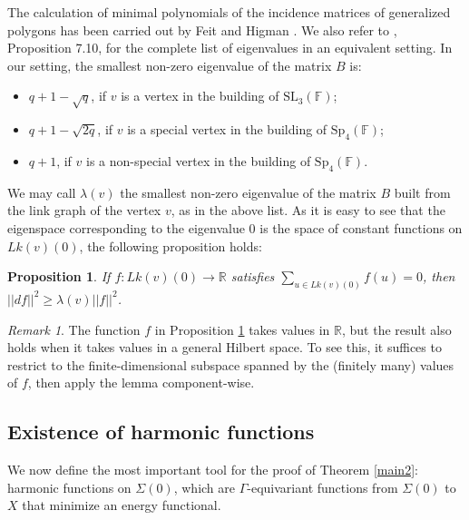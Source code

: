 \documentclass{article}
\theoremstyle{definition}
\theoremstyle{remark}
\newtheorem{rmk}[dfn]{Remark}
\theoremstyle{plain}
\newtheorem{prp}[dfn]{Proposition}
\begin{document}
The calculation of minimal polynomials of the incidence matrices of generalized polygons has been carried out by Feit and Higman \cite{feithigman}. We also refer to \cite{garland}, Proposition 7.10, for the complete list of eigenvalues in an equivalent setting. In our setting, the smallest non-zero eigenvalue of the matrix $B$ is:

\begin{itemize}
    \item $q+1-\sqrt{q}$, if $v$ is a vertex in the building of $\mathrm{SL}_3(\mathbb{F})$;
    \item $q+1-\sqrt{2q}$, if $v$ is a special vertex in the building of $\mathrm{Sp}_4(\mathbb{F})$;
    \item $q+1$, if $v$ is a non-special vertex in the building of $\mathrm{Sp}_4(\mathbb{F})$.
\end{itemize}

We may call $\lambda(v)$ the smallest non-zero eigenvalue of the matrix $B$ built from the link graph of the vertex $v$, as in the above list. As it is easy to see that the eigenspace corresponding to the eigenvalue $0$ is the space of constant functions on $Lk(v)(0)$, the following proposition holds:

\begin{prp} \label{eigen}
    If $f: Lk(v)(0)\rightarrow\mathbb{R}$ satisfies $\sum_{u\in Lk(v)(0)}{f(u)}=0$, then $||df||^2\geq\lambda(v)||f||^2$. \\
\end{prp}

\begin{rmk} \label{eigen2}
    The function $f$ in Proposition \ref{eigen} takes values in $\mathbb{R}$, but the result also holds when it takes values in a general Hilbert space. To see this, it suffices to restrict to the finite-dimensional subspace spanned by the (finitely many) values of $f$, then apply the lemma component-wise. \\
\end{rmk}

\subsection{Existence of harmonic functions} \label{exhar}

We now define the most important tool for the proof of Theorem \ref{main2}: harmonic functions on $\Sigma(0)$, which are $\Gamma$-equivariant functions from $\Sigma(0)$ to $X$ that minimize an energy functional. \\
\end{document}
